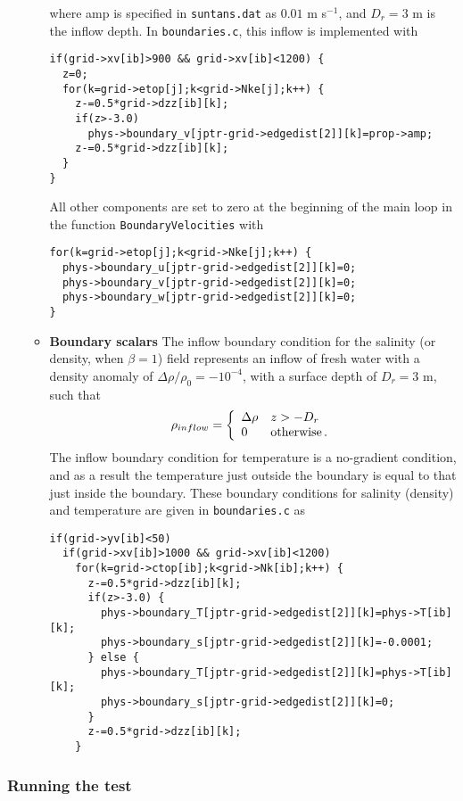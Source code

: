 \begin{itemize}
\begin{itemize}
where amp is specified in \verb+suntans.dat+ as $0.01$ m s$^{-1}$, and
$D_r=3$ m is the inflow depth.  In \verb+boundaries.c+, this inflow is implemented with
\begin{verbatim}
if(grid->xv[ib]>900 && grid->xv[ib]<1200) {
  z=0;
  for(k=grid->etop[j];k<grid->Nke[j];k++) {
    z-=0.5*grid->dzz[ib][k];
    if(z>-3.0)
      phys->boundary_v[jptr-grid->edgedist[2]][k]=prop->amp;
    z-=0.5*grid->dzz[ib][k];
  }
}
\end{verbatim}
All other components are set to zero at the beginning of the main loop in the function \verb+BoundaryVelocities+
with
\begin{verbatim}
for(k=grid->etop[j];k<grid->Nke[j];k++) {
  phys->boundary_u[jptr-grid->edgedist[2]][k]=0;
  phys->boundary_v[jptr-grid->edgedist[2]][k]=0;
  phys->boundary_w[jptr-grid->edgedist[2]][k]=0;
}
\end{verbatim}
\item[] {\bf Boundary scalars}
The inflow boundary condition for the salinity (or density, when $\beta=1$) field
represents an inflow of fresh water with a density anomaly of $\Delta \rho/\rho_0=-10^{-4}$, with a surface depth of $D_r=3$ m,
such that
\[
\rho_{inflow} = \left\{\begin{array}{ll}
                    \Delta \rho & z>-D_r \\
		    0 & \mbox{otherwise\,.}
		    \end{array}
             \right.
\]
The inflow boundary condition for temperature is a no-gradient condition, and as a result the temperature
just outside the boundary is equal to that just inside the boundary.  These boundary conditions for salinity (density)
and temperature are given in \verb+boundaries.c+ as
\begin{verbatim}
if(grid->yv[ib]<50)
  if(grid->xv[ib]>1000 && grid->xv[ib]<1200)
    for(k=grid->ctop[ib];k<grid->Nk[ib];k++) {
      z-=0.5*grid->dzz[ib][k];
      if(z>-3.0) {
        phys->boundary_T[jptr-grid->edgedist[2]][k]=phys->T[ib][k];
        phys->boundary_s[jptr-grid->edgedist[2]][k]=-0.0001;
      } else {
        phys->boundary_T[jptr-grid->edgedist[2]][k]=phys->T[ib][k];
        phys->boundary_s[jptr-grid->edgedist[2]][k]=0;
      }
      z-=0.5*grid->dzz[ib][k];
    }
\end{verbatim}
\end{itemize}
\end{itemize}

\subsubsection{Running the test}

